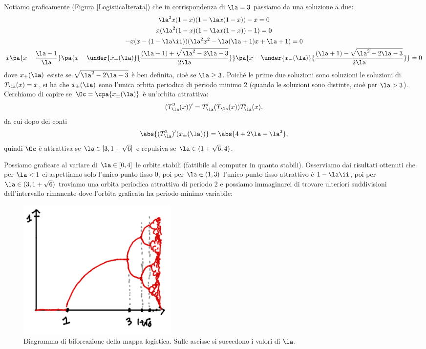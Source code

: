 \noindent
Notiamo graficamente (Figura \ref{LogisticaIterata}) che in corrispondenza di $\la=3$ passiamo da una soluzione a due:
\begin{gather*}
\la^2 x(1-x)(1-\la x(1-x))-x=0\\
x(\la^2(1-x)(1-\la x(1-x))-1)=0\\
-x(x-(1-\la\ii))(\la^2x^2-\la(\la+1)x+\la+1)=0\\
x\pa{x-\frac{\la-1}\la}\pa{x-\under{x_+(\la)}{\frac{(\la+1)+\sqrt{\la^2-2\la-3}}{2\la}}}\pa{x-\under{x_-(\la)}{\frac{(\la+1)-\sqrt{\la^2-2\la-3}}{2\la}}}=0
\end{gather*}
dove $x_{\pm}(\la)$ esiste se $\sqrt{\la^2-2\la-3}$ \`e ben definita, cio\`e se $\la\geq 3$. Poich\'e le prime due soluzioni sono soluzioni le soluzioni di $T_\la(x)=x$, si ha che $x_{\pm}(\la)$ sono l'unica orbita periodica di periodo minimo 2 (quando le soluzioni sono distinte, cio\`e per $\la>3$).\\
Cerchiamo di capire se $\Oc=\cpa{x_{\pm}(\la)}$ \`e un'orbita attrattiva:
\[(T_\la^2(x))'=T_\la'(T_\la(x))T'_\la(x),\]
da cui dopo dei conti
\[\abs{(T^2_\la)'(x_{\pm}(\la))}=\abs{4+2\la-\la^2},\]
quindi $\Oc$ \`e attrattiva se $\la\in [3,1+\sqrt 6]$ e repulsiva se $\la\in (1+\sqrt 6,4)$.
\vspace{0.25cm}

\noindent Possiamo graficare al variare di $\la\in [0,4]$ le orbite stabili (fattibile al computer in quanto stabili). Osserviamo dai risultati ottenuti che per $\la<1$ ci aspettiamo solo l'unico punto fisso $0$, poi per $\la\in(1,3)$ l'unico punto fisso attrattivo \`e $1-\la\ii$, poi per $\la\in (3,1+\sqrt 6)$ troviamo una orbita periodica attrattiva di periodo 2 e possiamo immaginarci di trovare ulteriori suddivisioni dell'intervallo rimanente dove l'orbita graficata ha periodo minimo variabile:

\begin{figure}[!htb]
    \centering
    \includegraphics[width=8cm]{Immagini/Diagramma_biforcazione_logistica.png}
    \caption{Diagramma di biforcazione della mappa logistica. Sulle ascisse si succedono i valori di $\la$.}
\end{figure}

